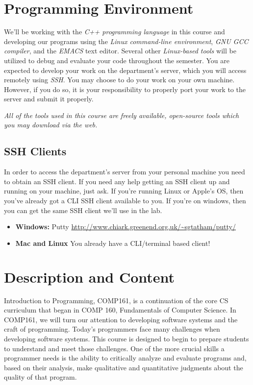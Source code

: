 \documentclass[10pt]{article}
\begin{document}
\section{Programming Environment}

We'll be working with the \textit{C++ programming language} in this course and developing our programs using the \textit{Linux command-line environment}, \textit{GNU GCC compiler}, and the \textit{EMACS} text editor.  Several other \textit{Linux-based tools} will be utilized to debug and evaluate your code throughout the semester. You are expected to develop your work on the department's server, which you will access remotely using \textit{SSH}.  You may choose to do your work on your own machine. However, if you do so, it is your responsibility to properly port your work to the server and submit it properly.  

\textit{All of the tools used in this course are freely available, open-source tools which you may download via the web.}


\subsection{SSH Clients}

In order to access the department's server from your personal machine you need to obtain an SSH client. If you need any help getting an SSH client up and running on your machine, just ask.  If you're running Linux or Apple's OS, then you've already got a CLI SSH client available to you.  If you're on windows, then you can get the same SSH client we'll use in the lab. 
\begin{itemize}
\item \textbf{Windows:} Putty \url{http://www.chiark.greenend.org.uk/~sgtatham/putty/}
\item \textbf{Mac and Linux} You already have a CLI/terminal based client!  
\end{itemize}

\section{Description and Content}

Introduction to Programming, COMP161, is a continuation of the core CS curriculum that began in COMP 160, Fundamentals of Computer Science.  In COMP161, we will turn our attention to developing software systems and the craft of programming.  Today's programmers face many challenges when developing software systems. This course is designed to begin to prepare students to understand and meet those challenges.  One of the more crucial skills a programmer needs is the ability to critically analyze and evaluate programs and, based on their analysis, make qualitative and quantitative judgments about the quality of that program.  
\end{document}
